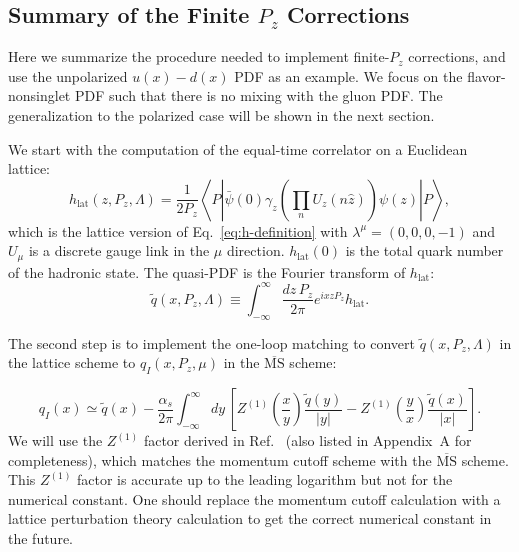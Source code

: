 \subsection{Summary of the Finite $P_z$ Corrections}

Here we summarize the procedure needed to implement finite-$P_z$ corrections,
and use the unpolarized $u(x)-d(x)$ PDF as an example. We focus on the flavor-nonsinglet PDF such that there is no mixing with the gluon PDF.
The generalization to the polarized case will be shown in the next section.

We start with the computation of the equal-time correlator on a Euclidean
lattice:
%
\begin{equation}
h_\text{lat}\left(z,P_z,\Lambda\right) =
  \frac{1}{2P_z} \left\langle P\left\vert \bar{\psi}(0) \gamma_z
  \left(\prod_n U_z (n\hat{z})\right) \psi(z) \right\vert P\right\rangle,
  \label{hlat}
\end{equation}
%
which is the lattice version of Eq.~\ref{eq:h-definition} with
$\lambda^\mu=(0,0,0,-1)$ and $U_\mu$ is a discrete gauge link in the $\mu$
direction. $h_\text{lat}\left(0\right)$ is the total quark number of
the hadronic state. The quasi-PDF is the Fourier transform of $h_\text{lat}$:
%
\begin{equation}
\widetilde{q}(x,P_z,\Lambda) \equiv
  \int_{-\infty}^\infty \frac{dz\,P_z}{2\pi} e^{ixzP_z} h_\text{lat}.
\end{equation}

The second step is to implement the one-loop matching to convert
$\widetilde{q}(x,P_z,\Lambda)$ in the lattice scheme to $q_I(x,P_z,\mu)$
in the $\overline{\text{MS}}$ scheme:

\begin{equation}
q_I(x) \simeq \widetilde{q}(x) -
  \frac{\alpha_s}{2\pi} \int_{-\infty}^\infty\!dy\,
  \left[ Z^{(1)}\!\left(\frac{x}{y}\right)
    \frac{\widetilde{q}(y)}{\left\vert y\right\vert} - 
    Z^{(1)}\!\left(\frac{y}{x}\right)
    \frac{\widetilde{q}(x)}{\left\vert x\right\vert} \right] .  \label{Z(1)}
\end{equation}
%
We will use the $Z^{(1)}$ factor derived in Ref.~\cite{Xiong:2013bka} (also listed in Appendix~A for completeness),
which matches the momentum cutoff scheme with the $\overline{\text{MS}}$
scheme. This $Z^{(1)}$ factor is accurate up to the leading logarithm
but not for the numerical constant. One should replace the momentum cutoff
calculation with a lattice perturbation theory calculation to get the
correct numerical constant in the future.


